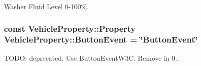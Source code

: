 Washer \hyperlink{interfaceFluid}{Fluid} Level 0-\/100\%. \hypertarget{classVehicleProperty_ab9fa252d209fbd2eb014c4d934d3d615}{
\subsubsection[{Button\+Event}]{\setlength{\rightskip}{0pt plus 5cm}const Vehicle\+Property\+::\+Property Vehicle\+Property\+::\+Button\+Event = \char`\"{}Button\+Event\char`\"{}\hspace{0.3cm}{\ttfamily [static]}}}\label{classVehicleProperty_ab9fa252d209fbd2eb014c4d934d3d615}


T\+O\+D\+O\+: deprecated. Use Button\+Event\+W3\+C. Remove in 0.. 


